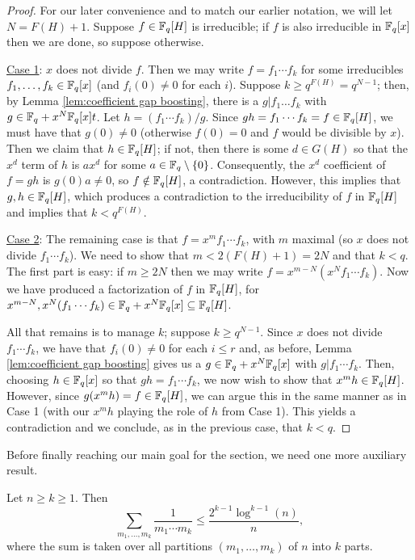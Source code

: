 \begin{proof}
	For our later convenience and to match our earlier notation, we will let $N = F(H)+1$.
	Suppose $f\in \mathbb{F}_q[H]$ is irreducible; if $f$ is also irreducible in $\mathbb{F}_q[x]$ then we are done, so suppose otherwise.  
	
	\underline{Case 1}: $x$ does not divide $f$.
	Then we may write $f = f_1\cdots f_k$ for some irreducibles $f_1,\dots,f_k\in \mathbb{F}_q[x]$ (and $f_i(0)\neq0$ for each $i$).
	Suppose $k\ge q^{F(H)} = q^{N-1}$; then, by Lemma \ref{lem:coefficient gap boosting}, there is a $g|f_1\dots f_k$ with $g\in \mathbb{F}_q+x^N \mathbb{F}_q[x]t$.
	Let $h = (f_1\cdots f_k)/g$.
	Since $gh = f_1\cdots f_k = f \in \mathbb{F}_q[H]$, we must have that $g(0) \neq 0$ (otherwise $f(0)=0$ and $f$ would be divisible by $x$).
	Then we claim that $h\in \mathbb{F}_q[H]$; if not, then there is some $d\in G(H)$ so that the $x^d$ term of $h$ is $a x^d$ for some $a\in \mathbb{F}_q\setminus\{0\}$.
	Consequently, the $x^d$ coefficient of $f = gh$ is $g(0)a \neq 0$, so $f\notin \mathbb{F}_q[H]$, a contradiction.
	However, this implies that $g,h\in \mathbb{F}_q[H]$, which produces a contradiction to the irreducibility of $f$ in $\mathbb{F}_q[H]$ and implies that $k < q^{F(H)}$.
	
	\underline{Case 2}: The remaining case is that $f = x^m f_1\cdots f_k$, with $m$ maximal (so $x$ does not divide $f_1\cdots f_k$).
	We need to show that $m<2(F(H)+1) = 2N$ and that $k<q$.
	The first part is easy: if $m\ge 2N$ then we may write $f = x^{m-N} (x^N f_1\cdots f_k)$.
	Now we have produced a factorization of $f$ in $\mathbb{F}_q[H]$, for $x^{m-N}, x^N (f_1\cdots f_k) \in \mathbb{F}_q + x^N \mathbb{F}_q[x] \subseteq \mathbb{F}_q[H]$.
	
	All that remains is to manage $k$; suppose $k \ge q^{N-1}$.
	Since $x$ does not divide $f_1 \cdots f_k$, we have that $f_i(0) \neq 0$ for each $i\le r$ and, as before, Lemma \ref{lem:coefficient gap boosting} gives us a $g\in \mathbb{F}_q+x^N \mathbb{F}_q[x]$ with $g|f_1\cdots f_k$.
	Then, choosing $h\in \mathbb{F}_q[x]$ so that $gh = f_1\cdots f_k$, we now wish to show that $x^m h \in \mathbb{F}_q[H]$.
	However, since $g (x^m h) = f \in \mathbb{F}_q[H]$, we can argue this in the same manner as in Case 1 (with our $x^m h$ playing the role of $h$ from Case 1).
	This yields a contradiction and we conclude, as in the previous case, that $k< q$.
\end{proof}

Before finally reaching our main goal for the section, we need one more auxiliary result.

\begin{lemma} \label{lem:srpp log bound}
	Let $n\ge k \ge 1$.
	Then
	\[
	\sum_{m_1,\dots,m_k} \frac{1}{m_1\cdots m_k} \le \frac{2^{k-1}\log^{k-1}(n)}{n},
	\]
	where the sum is taken over all partitions $(m_1,\dots, m_k)$ of $n$ into $k$ parts.
\end{lemma}

